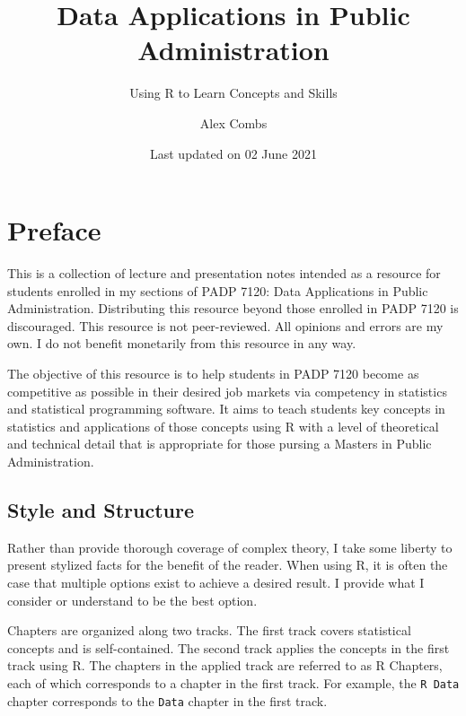 \documentclass[
]{book}
\title{Data Applications in Public Administration}
\subtitle{Using R to Learn Concepts and Skills}
\author{Alex Combs}
\date{Last updated on 02 June 2021}
\begin{document}
\maketitle

\cleardoublepage\newpage
\thispagestyle{empty}

\setlength{\abovedisplayskip}{-5pt}
\setlength{\abovedisplayshortskip}{-5pt}

{
\hypersetup{linkcolor=}
\setcounter{tocdepth}{2}
\tableofcontents
}
\hypertarget{preface}{%
\chapter*{Preface}\label{preface}}


This is a collection of lecture and presentation notes intended as a resource for students enrolled in my sections of PADP 7120: Data Applications in Public Administration. Distributing this resource beyond those enrolled in PADP 7120 is discouraged. This resource is not peer-reviewed. All opinions and errors are my own. I do not benefit monetarily from this resource in any way.

The objective of this resource is to help students in PADP 7120 become as competitive as possible in their desired job markets via competency in statistics and statistical programming software. It aims to teach students key concepts in statistics and applications of those concepts using R with a level of theoretical and technical detail that is appropriate for those pursing a Masters in Public Administration.

\hypertarget{style-and-structure}{%
\section*{Style and Structure}\label{style-and-structure}}


Rather than provide thorough coverage of complex theory, I take some liberty to present stylized facts for the benefit of the reader. When using R, it is often the case that multiple options exist to achieve a desired result. I provide what I consider or understand to be the best option.

Chapters are organized along two tracks. The first track covers statistical concepts and is self-contained. The second track applies the concepts in the first track using R. The chapters in the applied track are referred to as R Chapters, each of which corresponds to a chapter in the first track. For example, the \texttt{R\ Data} chapter corresponds to the \texttt{Data} chapter in the first track.
\end{document}

